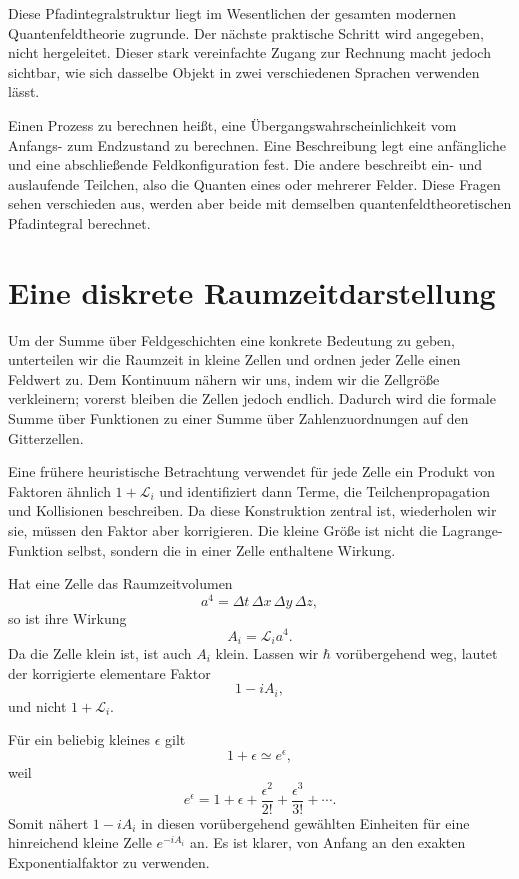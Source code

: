 Diese Pfadintegralstruktur liegt im Wesentlichen der gesamten modernen Quantenfeldtheorie zugrunde. Der nächste praktische Schritt wird angegeben, nicht hergeleitet. Dieser stark vereinfachte Zugang zur Rechnung macht jedoch sichtbar, wie sich dasselbe Objekt in zwei verschiedenen Sprachen verwenden lässt.

Einen Prozess zu berechnen heißt, eine Übergangswahrscheinlichkeit vom Anfangs- zum Endzustand zu berechnen. Eine Beschreibung legt eine anfängliche und eine abschließende Feldkonfiguration fest. Die andere beschreibt ein- und auslaufende Teilchen, also die Quanten eines oder mehrerer Felder. Diese Fragen sehen verschieden aus, werden aber beide mit demselben quantenfeldtheoretischen Pfadintegral berechnet.

\section{Eine diskrete Raumzeitdarstellung}

Um der Summe über Feldgeschichten eine konkrete Bedeutung zu geben, unterteilen wir die Raumzeit in kleine Zellen und ordnen jeder Zelle einen Feldwert zu. Dem Kontinuum nähern wir uns, indem wir die Zellgröße verkleinern; vorerst bleiben die Zellen jedoch endlich. Dadurch wird die formale Summe über Funktionen zu einer Summe über Zahlenzuordnungen auf den Gitterzellen.

Eine frühere heuristische Betrachtung verwendet für jede Zelle ein Produkt von Faktoren ähnlich \(1+\mathcal{L}_i\) und identifiziert dann Terme, die Teilchenpropagation und Kollisionen beschreiben. Da diese Konstruktion zentral ist, wiederholen wir sie, müssen den Faktor aber korrigieren. Die kleine Größe ist nicht die Lagrange-Funktion selbst, sondern die in einer Zelle enthaltene Wirkung.

Hat eine Zelle das Raumzeitvolumen
\begin{equation}
a^4=\Delta t\,\Delta x\,\Delta y\,\Delta z,
\end{equation}
so ist ihre Wirkung
\begin{equation}
A_i=\mathcal{L}_i a^4.
\end{equation}
Da die Zelle klein ist, ist auch \(A_i\) klein. Lassen wir \(\hbar\) vorübergehend weg, lautet der korrigierte elementare Faktor
\begin{equation}
1-iA_i,
\end{equation}
und nicht \(1+\mathcal{L}_i\).

Für ein beliebig kleines \(\epsilon\) gilt
\begin{equation}
1+\epsilon\simeq e^\epsilon,
\end{equation}
weil
\begin{equation}
e^\epsilon
=1+\epsilon+\frac{\epsilon^2}{2!}
+\frac{\epsilon^3}{3!}+\cdots.
\end{equation}
Somit nähert \(1-iA_i\) in diesen vorübergehend gewählten Einheiten für eine hinreichend kleine Zelle \(e^{-iA_i}\) an. Es ist klarer, von Anfang an den exakten Exponentialfaktor zu verwenden.

